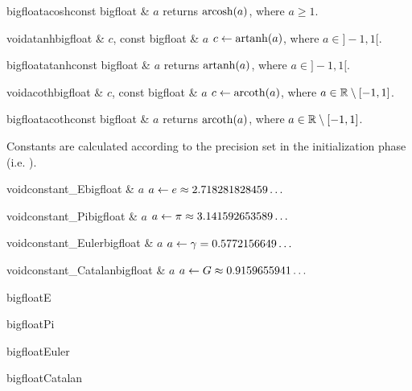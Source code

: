 \begin{fcode}{bigfloat}{acosh}{const bigfloat & $a$}
  returns $\operatorname{arcosh}(a)$, where $a \geq 1$.
\end{fcode}

\begin{fcode}{void}{atanh}{bigfloat & $c$, const bigfloat & $a$}
  $c \leftarrow \operatorname{artanh}(a)$, where $a \in ]-1, 1[$.
\end{fcode}

\begin{fcode}{bigfloat}{atanh}{const bigfloat & $a$}
  returns $\operatorname{artanh}(a)$, where $a \in ] -1, 1 [$.
\end{fcode}

\begin{fcode}{void}{acoth}{bigfloat & $c$, const bigfloat & $a$}
  $c \leftarrow \operatorname{arcoth}(a)$, where $a \in \mathbb{R} \setminus [-1, 1]$.
\end{fcode}

\begin{fcode}{bigfloat}{acoth}{const bigfloat & $a$}
  returns $\operatorname{arcoth}(a)$, where $a \in \mathbb{R} \setminus [ -1, 1 ]$.
\end{fcode}




Constants are calculated according to the precision set in the initialization phase (i.e.
).

\begin{fcode}{void}{constant_E}{bigfloat & $a$}
  $a \leftarrow e \approx 2.718281828459\dots$
\end{fcode}

\begin{fcode}{void}{constant_Pi}{bigfloat & $a$}
  $a \leftarrow \pi \approx 3.141592653589\dots$
\end{fcode}

\begin{fcode}{void}{constant_Euler}{bigfloat & $a$}
  $a \leftarrow \gamma = 0.5772156649\dots$
\end{fcode}

\begin{fcode}{void}{constant_Catalan}{bigfloat & $a$}
  $a \leftarrow G \approx 0.9159655941\dots$
\end{fcode}

\begin{fcode}{bigfloat}{E}{}
\end{fcode}
\begin{fcode}{bigfloat}{Pi}{}
\end{fcode}
\begin{fcode}{bigfloat}{Euler}{}
\end{fcode}
\begin{fcode}{bigfloat}{Catalan}{}
\end{fcode}


